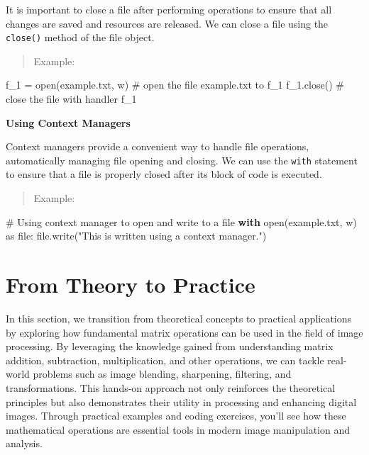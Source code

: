 \documentclass[
  letterpaper,
  DIV=11,
  numbers=noendperiod]{scrreprt}
\newenvironment{Shaded}{\begin{snugshade}}{\end{snugshade}}
\newcommand{\BuiltInTok}[1]{\textcolor[rgb]{0.00,0.23,0.31}{#1}}
\newcommand{\CommentTok}[1]{\textcolor[rgb]{0.37,0.37,0.37}{#1}}
\newcommand{\ControlFlowTok}[1]{\textcolor[rgb]{0.00,0.23,0.31}{\textbf{#1}}}
\newcommand{\ImportTok}[1]{\textcolor[rgb]{0.00,0.46,0.62}{#1}}
\newcommand{\NormalTok}[1]{\textcolor[rgb]{0.00,0.23,0.31}{#1}}
\newcommand{\OperatorTok}[1]{\textcolor[rgb]{0.37,0.37,0.37}{#1}}
\newcommand{\StringTok}[1]{\textcolor[rgb]{0.13,0.47,0.30}{#1}}
\theoremstyle{plain}
\theoremstyle{definition}
\theoremstyle{remark}
\begin{document}
It is important to close a file after performing operations to ensure
that all changes are saved and resources are released. We can close a
file using the \texttt{close()} method of the file object.

\begin{quote}
Example:
\end{quote}

\begin{Shaded}
\begin{Highlighting}[]
\NormalTok{f\_1 }\OperatorTok{=} \BuiltInTok{open}\NormalTok{(}\StringTok{\textquotesingle{}example.txt\textquotesingle{}}\NormalTok{, }\StringTok{\textquotesingle{}w\textquotesingle{}}\NormalTok{) }\CommentTok{\# open the file example.txt to f\_1}
\NormalTok{f\_1.close() }\CommentTok{\# close the file with handler \textquotesingle{}f\_1\textquotesingle{}}
\end{Highlighting}
\end{Shaded}

\textbf{Using Context Managers}

Context managers provide a convenient way to handle file operations,
automatically managing file opening and closing. We can use the
\texttt{with} statement to ensure that a file is properly closed after
its block of code is executed.

\begin{quote}
Example:
\end{quote}

\begin{Shaded}
\begin{Highlighting}[]
\CommentTok{\# Using context manager to open and write to a file}
\ControlFlowTok{with} \BuiltInTok{open}\NormalTok{(}\StringTok{\textquotesingle{}example.txt\textquotesingle{}}\NormalTok{, }\StringTok{\textquotesingle{}w\textquotesingle{}}\NormalTok{) }\ImportTok{as} \BuiltInTok{file}\NormalTok{:}
    \BuiltInTok{file}\NormalTok{.write(}\StringTok{"This is written using a context manager."}\NormalTok{)}
\end{Highlighting}
\end{Shaded}

\section{From Theory to Practice}\label{from-theory-to-practice}

In this section, we transition from theoretical concepts to practical
applications by exploring how fundamental matrix operations can be used
in the field of image processing. By leveraging the knowledge gained
from understanding matrix addition, subtraction, multiplication, and
other operations, we can tackle real-world problems such as image
blending, sharpening, filtering, and transformations. This hands-on
approach not only reinforces the theoretical principles but also
demonstrates their utility in processing and enhancing digital images.
Through practical examples and coding exercises, you'll see how these
mathematical operations are essential tools in modern image manipulation
and analysis.
\end{document}
